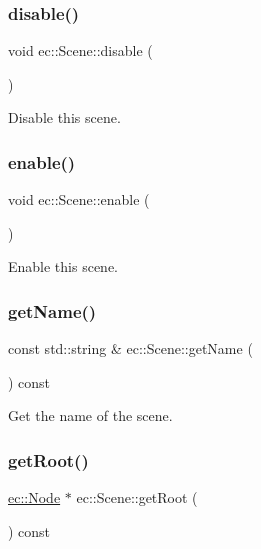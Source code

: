 \subsubsection{\texorpdfstring{disable()}{disable()}}
{\footnotesize\ttfamily void ec\+::\+Scene\+::disable (\begin{DoxyParamCaption}{ }\end{DoxyParamCaption})}



Disable this scene. 

\mbox{\label{classec_1_1_scene_ab1788ac3be0db2d82ee2f8c5fa0cecef}} 
\subsubsection{\texorpdfstring{enable()}{enable()}}
{\footnotesize\ttfamily void ec\+::\+Scene\+::enable (\begin{DoxyParamCaption}{ }\end{DoxyParamCaption})}



Enable this scene. 

\mbox{\label{classec_1_1_scene_a24c00d38f3b17123f10f02ff77830f62}} 
\subsubsection{\texorpdfstring{get\+Name()}{getName()}}
{\footnotesize\ttfamily const std\+::string \& ec\+::\+Scene\+::get\+Name (\begin{DoxyParamCaption}{ }\end{DoxyParamCaption}) const}



Get the name of the scene. 

\mbox{\label{classec_1_1_scene_aef77276f4a386c5b66159ecb1d4d072c}} 
\subsubsection{\texorpdfstring{get\+Root()}{getRoot()}}
{\footnotesize\ttfamily \mbox{\hyperlink{classec_1_1_node}{ec\+::\+Node}} $\ast$ ec\+::\+Scene\+::get\+Root (\begin{DoxyParamCaption}{ }\end{DoxyParamCaption}) const}



